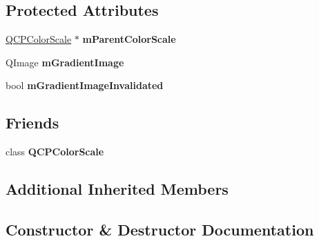 \subsection*{Protected Attributes}
\begin{DoxyCompactItemize}
\item 
\hyperlink{classQCPColorScale}{Q\+C\+P\+Color\+Scale} $\ast$ {\bfseries m\+Parent\+Color\+Scale}\hypertarget{classQCPColorScaleAxisRectPrivate_a311c73f51a4cb0b556388197833cf099}{}\label{classQCPColorScaleAxisRectPrivate_a311c73f51a4cb0b556388197833cf099}

\item 
Q\+Image {\bfseries m\+Gradient\+Image}\hypertarget{classQCPColorScaleAxisRectPrivate_ad4f7c8ee1c6012d9950870811773119c}{}\label{classQCPColorScaleAxisRectPrivate_ad4f7c8ee1c6012d9950870811773119c}

\item 
bool {\bfseries m\+Gradient\+Image\+Invalidated}\hypertarget{classQCPColorScaleAxisRectPrivate_a2c0b15b071e1f93006b48b5be022a631}{}\label{classQCPColorScaleAxisRectPrivate_a2c0b15b071e1f93006b48b5be022a631}

\end{DoxyCompactItemize}
\subsection*{Friends}
\begin{DoxyCompactItemize}
\item 
class {\bfseries Q\+C\+P\+Color\+Scale}\hypertarget{classQCPColorScaleAxisRectPrivate_a60f6031408a325ebd1bbbad1ccf9b897}{}\label{classQCPColorScaleAxisRectPrivate_a60f6031408a325ebd1bbbad1ccf9b897}

\end{DoxyCompactItemize}
\subsection*{Additional Inherited Members}


\subsection{Constructor \& Destructor Documentation}
